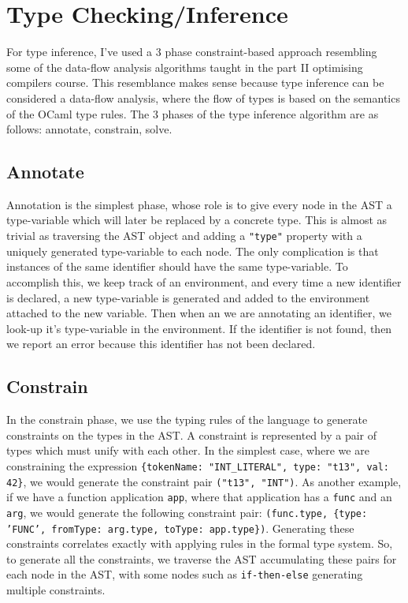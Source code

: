 \documentclass[12pt,a4paper,twoside,openright]{report}
\begin{document}
\section{Type Checking/Inference}
For type inference, I've used a 3 phase constraint-based approach resembling some of the data-flow analysis algorithms taught in the part II optimising compilers course.
This resemblance makes sense because type inference can be considered a data-flow analysis, where the flow of types is based on the semantics of the OCaml type rules.
The 3 phases of the type inference algorithm are as follows: annotate, constrain, solve.

\subsection{Annotate}
Annotation is the simplest phase, whose role is to give every node in the AST a type-variable which will later be replaced by a concrete type.
This is almost as trivial as traversing the AST object and adding a {\tt "type"} property with a uniquely generated type-variable to each node.
The only complication is that instances of the same identifier should have the same type-variable.
To accomplish this, we keep track of an environment, and every time a new identifier is declared, a new type-variable is generated and added to the environment attached to the new variable.
Then when an we are annotating an identifier, we look-up it's type-variable in the environment.
If the identifier is not found, then we report an error because this identifier has not been declared.
\subsection{Constrain}
In the constrain phase, we use the typing rules of the language to generate constraints on the types in the AST.
A constraint is represented by a pair of types which must unify with each other.
In the simplest case, where we are constraining the expression {\tt \{tokenName: "INT\_LITERAL", type: "t13", val: 42\}}, we would generate the constraint pair {\tt ("t13", "INT")}.
As another example, if we have a function application {\tt app}, where that application has a {\tt func} and an {\tt arg}, we would generate the following constraint pair: {\tt (func.type, \{type: 'FUNC', fromType: arg.type, toType: app.type\})}.
Generating these constraints correlates exactly with applying rules in the formal type system.
So, to generate all the constraints, we traverse the AST accumulating these pairs for each node in the AST, with some nodes such as {\tt if-then-else} generating multiple constraints.
\end{document}
